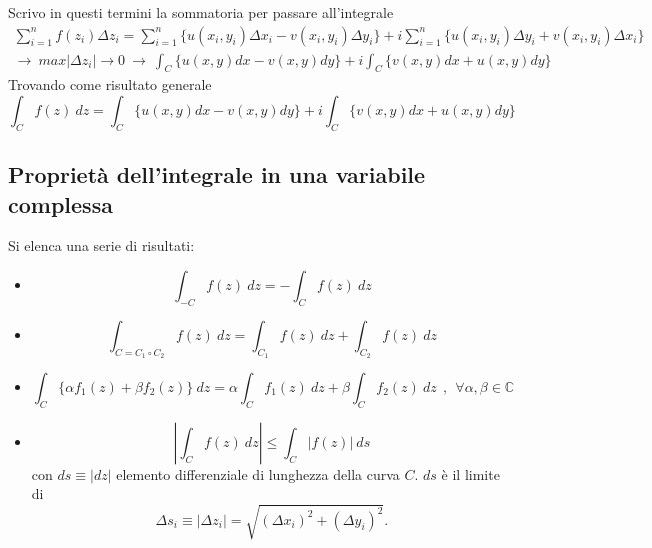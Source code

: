\documentclass[twoside]{article}
\begin{document}
Scrivo in questi termini la sommatoria per passare all'integrale
\begin{equation}
    \begin{split}
        \sum_{i=1}^n f(z_i)\Delta z_i=\sum_{i=1}^n \{ u(x_i,y_i)\Delta x_i - v(x_i,y_i)\Delta y_i \} +i \sum_{i=1}^n \{ u(x_i,y_i)\Delta y_i + v(x_i,y_i)\Delta x_i\} \\
        \rightarrow \ max|\Delta z_i| \to 0 \ \rightarrow \ \int_C \{ u(x,y)dx - v(x,y)dy  \} +i \int_C \{ v(x,y)dx+u(x,y)dy \}
    \end{split}
\end{equation}
Trovando come risultato generale 
\begin{equation}
    \int_C f(z) \ dz = \int_C \{ u(x,y)dx - v(x,y)dy  \} +i \int_C \{ v(x,y)dx+u(x,y)dy \}
\end{equation}


\subsection{Proprietà dell'integrale in una variabile complessa}
Si elenca una serie di risultati:
\begin{itemize}
    \item \begin{equation}
        \int_{-C}f(z) \ dz= - \int_C f(z) \ dz
    \end{equation}
    \item \begin{equation}
        \int_{C=C_1 \circ C_2} f(z) \ dz= \int_{C_1} f(z) \ dz + \int_{C_2} f(z) \ dz
    \end{equation}
    \item \begin{equation}
        \int_C \{ \alpha f_1(z) +\beta f_2(z) \} \ dz= \alpha \int_C f_1 (z) \ dz + \beta \int_C f_2(z) \ dz \ \ , \ \ \forall \alpha, \beta \in \mathds{C}
    \end{equation}
    \item \begin{equation} \label{3.1.4}
        \left|\int_C f(z) \ dz\right| \leq \int_C |f(z)| \ ds
    \end{equation}
    con $ds\equiv |dz|$ elemento differenziale di lunghezza della curva $C$. $ds$ è il limite di 
    \begin{equation}
        \Delta s_i \equiv |\Delta z_i|=\sqrt{(\Delta x_i)^2 + (\Delta y_i)^2}.
    \end{equation}
\end{itemize}
\end{document}
